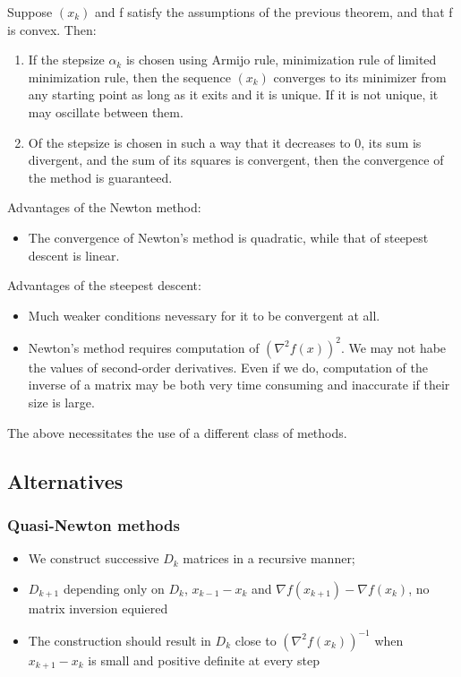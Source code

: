 \thm{}
{
    Suppose $(x_k)$ and f satisfy the assumptions of the previous theorem, and that f is convex. Then:
    \begin{enumerate}
        \item If the stepsize $\alpha_k$ is chosen using Armijo rule, minimization rule of limited minimization rule, then the sequence  $(x_k)$ converges to its minimizer from any starting point as long as it exits and it is unique. If it is not unique, it may oscillate between them.
        \item Of the stepsize is chosen in such a way that it decreases to 0, its sum is divergent, and the sum of its squares is convergent, then the convergence of the method is guaranteed.
    \end{enumerate}
}


Advantages of the Newton method:
\begin{itemize}
    \item The convergence of Newton's method is quadratic, while that of steepest descent is linear.
\end{itemize}
Advantages of the steepest descent:
\begin{itemize}
        \item Much weaker conditions nevessary for it to be convergent at all.
        \item Newton's method requires computation of $\left( \nabla^{2}f(x)\right)^{2}$. We may not habe the values of second-order derivatives. Even if we do, computation of the inverse of a matrix may be both very time consuming and inaccurate if their size is large.
        
\end{itemize}

The above necessitates the use of a different class of methods.
\subsection{Alternatives}
\subsubsection{Quasi-Newton methods}
\begin{itemize}
        \item We construct successive $D_k$ matrices in a recursive manner;
        \item $D_{k+1}$ depending only on  $D_k$,  $x_{k-1}-x_k$ and  $\nabla f(x_{k+1}) - \nabla f(x_k)$, no matrix inversion equiered
        \item The construction should result in  $D_k$ close to  $\left( \nabla^{2}f(x_k)\right)^{-1}$ when $x_{k+1}-x_k$ is small and positive definite at every step
        
\end{itemize}

